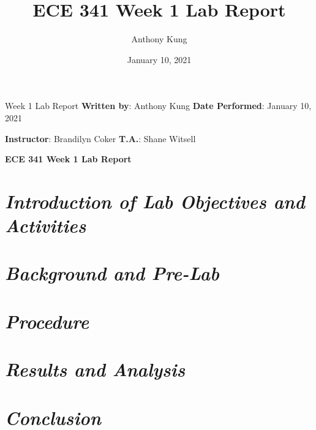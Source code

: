 \documentclass{article}
\title{ECE 341 Week 1 Lab Report} %
\author{
  Anthony Kung %
}
\date{January 10, 2021} %
\begin{document}
\selectfont


Week 1 Lab Report %
\newline
\textbf{Written by}: Anthony Kung %
\hfill
\textbf{Date Performed}: January 10, 2021 %

\textbf{Instructor}:  Brandilyn Coker
\hfill
\textbf{T.A.}: Shane Witsell

\begin{center}
  \large\textbf{ECE 341 Week 1 Lab Report} %
  \\
\end{center}

\setlength{\parskip}{1em}


\section{\textbf{\textit{Introduction of Lab Objectives and Activities}}}

\section{\textbf{\textit{Background and Pre-Lab}}}

\section{\textbf{\textit{Procedure}}}

\section{\textbf{\textit{Results and Analysis}}}

\section{\textbf{\textit{Conclusion}}}

\end{document}

